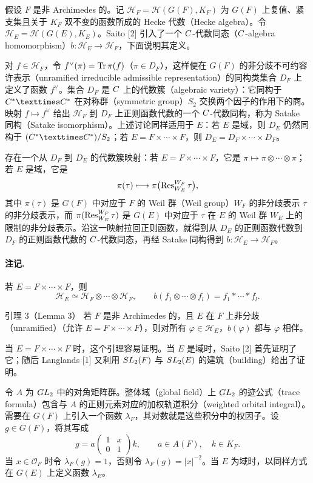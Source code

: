 假设 $F$ 是非 Archimedes 的。记 $\mathcal H_F=\mathcal H(G(F),K_F)$ 为 $G(F)$ 上复值、紧支集且关于 $K_F$ 双不变的函数所成的 Hecke 代数（Hecke algebra）。令 $\mathcal H_E=\mathcal H(G(E),K_E)$。Saito [2] 引入了一个 $C$-代数同态（$C$-algebra homomorphism）$b:\mathcal H_E\to\mathcal H_F$，下面说明其定义。

对 $f\in\mathcal H_F$，令 $f^\vee(\pi)=\operatorname{Tr}\pi(f)$（$\pi\in D_F$），这样便在 $G(F)$ 的非分歧不可约容许表示（unramified irreducible admissible representation）的同构类集合 $D_F$ 上定义了函数 $f^\vee$。集合 $D_F$ 是 $C$ 上的代数簇（algebraic variety）：它同构于 $\C^*\times\C^*$ 在对称群（symmetric group）$S_2$ 交换两个因子的作用下的商。映射 $f\mapsto f^\vee$ 给出 $\mathcal H_F$ 到 $D_F$ 上正则函数代数的一个 $C$-代数同构，称为 Satake 同构（Satake isomorphism）。上述讨论同样适用于 $E$：若 $E$ 是域，则 $D_E$ 仍然同构于 $(\C^*\times\C^*)/S_2$；若 $E=F\times\cdots\times F$，则 $D_E=D_F\times\cdots\times D_F$。

存在一个从 $D_F$ 到 $D_E$ 的代数簇映射：若 $E=F\times\cdots\times F$，它是 $\pi\mapsto\pi\otimes\cdots\otimes\pi$；若 $E$ 是域，它是
\[
 \pi(\tau)\longmapsto\pi\bigl(\operatorname{Res}^{W_F}_{W_E}\tau\bigr),
\]
其中 $\pi(\tau)$ 是 $G(F)$ 中对应于 $F$ 的 Weil 群（Weil group）$W_F$ 的非分歧表示 $\tau$ 的非分歧表示，而 $\pi(\operatorname{Res}^{W_F}_{W_E}\tau)$ 是 $G(E)$ 中对应于 $\tau$ 在 $E$ 的 Weil 群 $W_E$ 上的限制的非分歧表示。沿这一映射拉回正则函数，就得到从 $D_E$ 的正则函数代数到 $D_F$ 的正则函数代数的 $C$-代数同态，再经 Satake 同构得到 $b:\mathcal H_E\to\mathcal H_F$。

\paragraph*{注记.}
若 $E=F\times\cdots\times F$，则
\[
 \mathcal H_E\simeq\mathcal H_F\otimes\cdots\otimes\mathcal H_F,
 \qquad b(f_1\otimes\cdots\otimes f_l)=f_1*\cdots*f_l.
\]

\begin{originaltheorem}{引理 3（Lemma 3）}
若 $F$ 是非 Archimedes 的，且 $E$ 在 $F$ 上非分歧（unramified）（允许 $E=F\times\cdots\times F$），则对所有 $\varphi\in\mathcal H_E$，$b(\varphi)$ 都与 $\varphi$ 相伴。
\end{originaltheorem}

当 $E=F\times\cdots\times F$ 时，这个引理容易证明。当 $E$ 是域时，Saito [2] 首先证明了它；随后 Langlands [1] 又利用 $SL_2(F)$ 与 $SL_2(E)$ 的建筑（building）给出了证明。

令 $A$ 为 $GL_2$ 中的对角矩阵群。整体域（global field）上 $GL_2$ 的迹公式（trace formula）包含与 $A$ 的正则元素对应的加权轨道积分（weighted orbital integral）。需要在 $G(F)$ 上引入一个函数 $\lambda_F$，其对数就是这些积分中的权因子。设 $g\in G(F)$，将其写成
\[
 g=a\begin{pmatrix}1&x\\0&1\end{pmatrix}k,
 \qquad a\in A(F),\quad k\in K_F.
\]
当 $x\in\mathcal O_F$ 时令 $\lambda_F(g)=1$，否则令 $\lambda_F(g)=|x|^{-2}$。当 $E$ 为域时，以同样方式在 $G(E)$ 上定义函数 $\lambda_E$。

